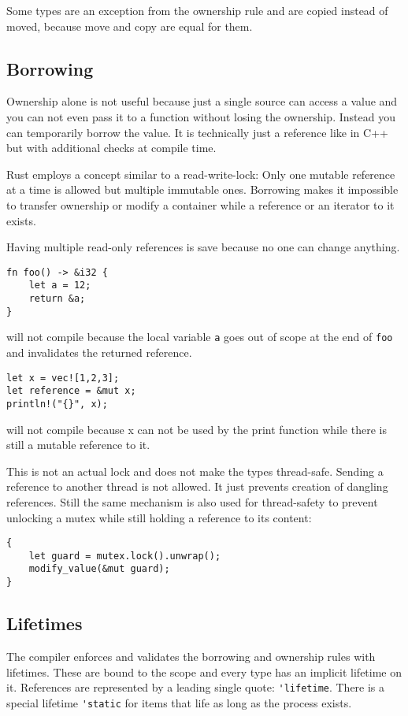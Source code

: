 \documentclass[conference,twocolumn]{IEEEtran}
\begin{document}
Some types are an exception from the ownership rule and are copied instead of moved, because move and copy are equal for them.


\subsection{Borrowing}
Ownership alone is not useful because just a single source can access a value and you can not even pass it to a function without losing the ownership. \cite{RustBook}
Instead you can temporarily borrow the value. It is technically just a reference like in C++ but with additional checks at compile time.

Rust employs a concept similar to a read-write-lock: Only one mutable reference at a time is allowed but multiple immutable ones. Borrowing makes it impossible to transfer ownership or modify a container while a reference or an iterator to it exists.

Having multiple read-only references is save because no one can change anything.

\begin{lstlisting}[frame=single]
fn foo() -> &i32 {
    let a = 12;
    return &a;
}
\end{lstlisting}
will not compile because the local variable \verb|a| goes out of scope at the end of \verb|foo| and invalidates the returned reference.


\begin{lstlisting}[frame=single]
let x = vec![1,2,3];
let reference = &mut x;
println!("{}", x);
\end{lstlisting}
will not compile because x can not be used by the print function while there is still a mutable reference to it.

This is not an actual lock and does not make the types thread-safe. Sending a reference to another thread is not allowed. It just prevents creation of dangling references. Still the same mechanism is also used for thread-safety to prevent unlocking a mutex while still holding a reference to its content:

\begin{lstlisting}[frame=single]
{
    let guard = mutex.lock().unwrap();
    modify_value(&mut guard);
}
\end{lstlisting}


\subsection{Lifetimes}
The compiler enforces and validates the borrowing and ownership rules with lifetimes. These are bound to the scope and every type has an implicit lifetime on it. \cite{RustBook}
References are represented by a leading single quote: \verb|'lifetime|.
There is a special lifetime \verb|'static| for items that life as long as the process exists.
\end{document}
